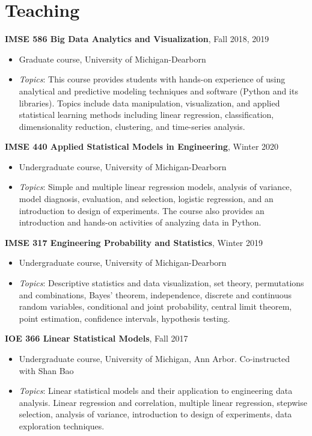 \documentclass[11pt]{article}
\newenvironment{main}
{\begin{adjustwidth}{3em}{}}
{\end{adjustwidth}}
\begin{document}
\section*{Teaching}
\begin{main}

\textbf{IMSE 586 Big Data Analytics and Visualization}, Fall 2018, 2019

\begin{itemize}
    \item[] Graduate course, University of Michigan-Dearborn 
    \item[] \textit{Topics}: This course provides students with hands-on experience of using analytical and predictive modeling techniques and software (Python and its libraries). Topics include data manipulation, visualization, and applied statistical learning methods including linear regression, classification, dimensionality reduction, clustering, and time-series analysis. 
\end{itemize}


\textbf{IMSE 440 Applied Statistical Models in Engineering}, Winter 2020

\begin{itemize}
    \item[] Undergraduate course, University of Michigan-Dearborn
    \item[] \textit{Topics}: Simple and multiple linear regression models, analysis of variance, model diagnosis, evaluation, and selection, logistic regression, and an introduction to design of experiments. The course also provides an introduction and hands-on activities of analyzing data in Python.
\end{itemize}


\textbf{IMSE 317 Engineering Probability and Statistics}, Winter 2019

\begin{itemize}
    \item[] Undergraduate course, University of Michigan-Dearborn
    \item[] \textit{Topics}: Descriptive statistics and data visualization, set theory, permutations and combinations, Bayes’ theorem, independence, discrete and continuous random variables, conditional and joint probability, central limit theorem, point estimation, confidence intervals, hypothesis testing. 
\end{itemize}


\textbf{IOE 366 Linear Statistical Models}, Fall 2017

\begin{itemize}
    \item[] Undergraduate course, University of Michigan, Ann Arbor. Co-instructed with Shan Bao
    \item[] \textit{Topics}: Linear statistical models and their application to engineering data analysis. Linear regression and correlation, multiple linear regression, stepwise selection, analysis of variance, introduction to design of experiments, data exploration techniques.
\end{itemize}



\end{main}
\end{document}
